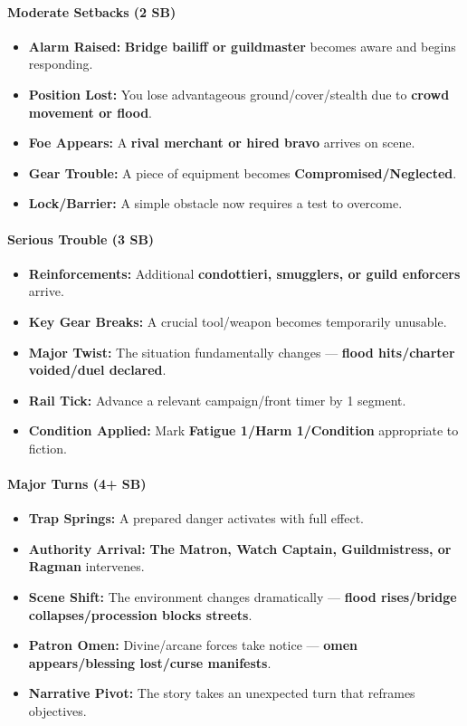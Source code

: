 \paragraph{Moderate Setbacks (2 SB)}
\begin{itemize}
\item \textbf{Alarm Raised:} \textbf{Bridge bailiff or guildmaster} becomes aware and begins responding.
\item \textbf{Position Lost:} You lose advantageous ground/cover/stealth due to \textbf{crowd movement or flood}.
\item \textbf{Foe Appears:} A \textbf{rival merchant or hired bravo} arrives on scene.
\item \textbf{Gear Trouble:} A piece of equipment becomes \textbf{Compromised/Neglected}.
\item \textbf{Lock/Barrier:} A simple obstacle now requires a test to overcome.
\end{itemize}

\paragraph{Serious Trouble (3 SB)}
\begin{itemize}
\item \textbf{Reinforcements:} Additional \textbf{condottieri, smugglers, or guild enforcers} arrive.
\item \textbf{Key Gear Breaks:} A crucial tool/weapon becomes temporarily unusable.
\item \textbf{Major Twist:} The situation fundamentally changes --- \textbf{flood hits/charter voided/duel declared}.
\item \textbf{Rail Tick:} Advance a relevant campaign/front timer by 1 segment.
\item \textbf{Condition Applied:} Mark \textbf{Fatigue 1/Harm 1/Condition} appropriate to fiction.
\end{itemize}

\paragraph{Major Turns (4+ SB)}
\begin{itemize}
\item \textbf{Trap Springs:} A prepared danger activates with full effect.
\item \textbf{Authority Arrival:} \textbf{The Matron, Watch Captain, Guildmistress, or Ragman} intervenes.
\item \textbf{Scene Shift:} The environment changes dramatically --- \textbf{flood rises/bridge collapses/procession blocks streets}.
\item \textbf{Patron Omen:} Divine/arcane forces take notice --- \textbf{omen appears/blessing lost/curse manifests}.
\item \textbf{Narrative Pivot:} The story takes an unexpected turn that reframes objectives.
\end{itemize}


